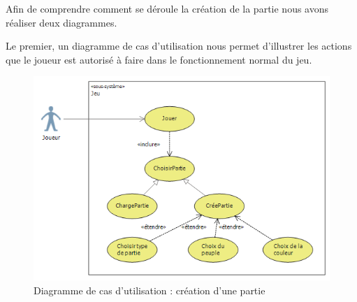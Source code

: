 Afin de comprendre comment se déroule la création de la partie nous avons réaliser deux diagrammes.

Le premier, un diagramme de cas d'utilisation nous permet d'illustrer les actions que le joueur est autorisé à faire dans le fonctionnement normal du jeu.
\begin{figure}[!h]
\centering
\includegraphics[width=\textwidth]{Parties/Images/cdu_CreationPartie.png}
\caption{Diagramme de cas d'utilisation : création d'une partie}
\label{fig:cdu_CreationPartie}
\end{figure}
